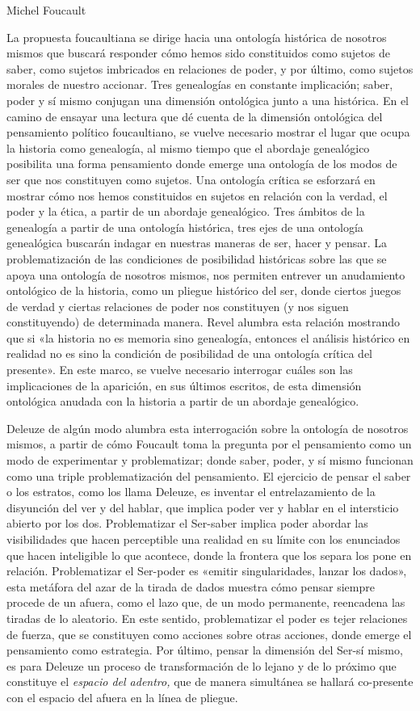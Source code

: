 Michel Foucault

La propuesta foucaultiana se dirige hacia una ontología histórica de nosotros mismos que buscará responder cómo hemos sido constituidos como sujetos de saber, como sujetos imbricados en relaciones de poder, y por último, como sujetos morales de nuestro accionar. Tres genealogías en constante implicación; saber, poder y sí mismo conjugan una dimensión ontológica junto a una histórica. En el camino de ensayar una lectura que dé cuenta de la dimensión ontológica del pensamiento político foucaultiano, se vuelve necesario mostrar el lugar que ocupa la historia como genealogía, al mismo tiempo que el abordaje genealógico posibilita una forma pensamiento donde emerge una ontología de los modos de ser que nos constituyen como sujetos. Una ontología crítica se esforzará en mostrar cómo nos hemos constituidos en sujetos en relación con la verdad, el poder y la ética, a partir de un abordaje genealógico. Tres ámbitos de la genealogía a partir de una ontología histórica, tres ejes de una ontología genealógica buscarán indagar en nuestras maneras de ser, hacer y pensar. La problematización de las condiciones de posibilidad históricas sobre las que se apoya una ontología de nosotros mismos, nos permiten entrever un anudamiento ontológico de la historia, como un pliegue histórico del ser, donde ciertos juegos de verdad y ciertas relaciones de poder nos constituyen (y nos siguen constituyendo) de determinada manera. Revel alumbra esta relación mostrando que si «la historia no es memoria sino genealogía, entonces el análisis histórico en realidad no es sino la condición de posibilidad de una ontología crítica del presente». En este marco, se vuelve necesario interrogar cuáles son las implicaciones de la aparición, en sus últimos escritos, de esta dimensión ontológica anudada con la historia a partir de un abordaje genealógico.

Deleuze de algún modo alumbra esta interrogación sobre la ontología de nosotros mismos, a partir de cómo Foucault toma la pregunta por el pensamiento como un modo de experimentar y problematizar; donde saber, poder, y sí mismo funcionan como una triple problematización del pensamiento. El ejercicio de pensar el saber o los estratos, como los llama Deleuze, es inventar el entrelazamiento de la disyunción del ver y del hablar, que implica poder ver y hablar en el intersticio abierto por los dos. Problematizar el Ser-saber implica poder abordar las visibilidades que hacen perceptible una realidad en su límite con los enunciados que hacen inteligible lo que acontece, donde la frontera que los separa los pone en relación. Problematizar el Ser-poder es «emitir singularidades, lanzar los dados», esta metáfora del azar de la tirada de dados muestra cómo pensar siempre procede de un afuera, como el lazo que, de un modo permanente, reencadena las tiradas de lo aleatorio. En este sentido, problematizar el poder es tejer relaciones de fuerza, que se constituyen como acciones sobre otras acciones, donde emerge el pensamiento como estrategia. Por último, pensar la dimensión del Ser-sí mismo, es para Deleuze un proceso de transformación de lo lejano y de lo próximo que constituye el \emph{espacio del adentro,} que de manera simultánea se hallará co-presente con el espacio del afuera en la línea de pliegue.

